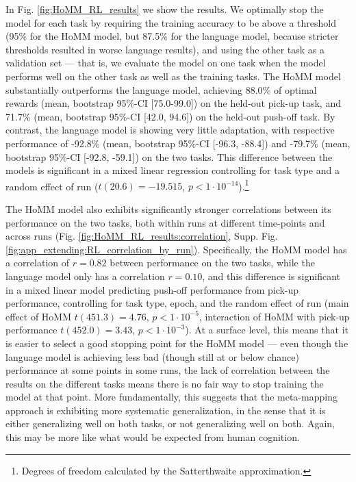 In Fig. \ref{fig:HoMM_RL_results} we show the results. We optimally stop the model for each task by requiring the training accuracy to be above a threshold (95\% for the HoMM model, but 87.5\% for the language model, because stricter thresholds resulted in worse language results), and using the other task as a validation set --- that is, we evaluate the model on one task when the model performs well on the other task as well as the training tasks. The HoMM model substantially outperforms the language model, achieving 88.0\% of optimal rewards (mean, bootstrap 95\%-CI [75.0-99.0]) on the held-out pick-up task, and 71.7\% (mean, bootstrap 95\%-CI [42.0, 94.6]) on the held-out push-off task. By contrast, the language model is showing very little adaptation, with respective performance of -92.8\% (mean, bootstrap 95\%-CI [-96.3, -88.4]) and -79.7\% (mean, bootstrap 95\%-CI [-92.8, -59.1]) on the two tasks. This difference between the models is significant in a mixed linear regression controlling for task type and a random effect of run (\(t (20.6) = -19.515\), \(p < 1\cdot10^{-14}\)).\footnote{Degrees of freedom calculated by the Satterthwaite approximation.}\par

The HoMM model also exhibits significantly stronger correlations between its performance on the two tasks, both within runs at different time-points and across runs (Fig. \ref{fig:HoMM_RL_results:correlation}, Supp. Fig. \ref{fig:app_extending:RL_correlation_by_run}). Specifically, the HoMM model has a correlation of \(r=0.82\) between performance on the two tasks, while the language model only has a correlation \(r=0.10\), and this difference is significant in a mixed linear model predicting push-off performance from pick-up performance, controlling for task type, epoch, and the random effect of run (main effect of HoMM \(t(451.3) = 4.76\), \(p < 1\cdot 10^{-5}\), interaction of HoMM with pick-up performance \(t(452.0) = 3.43\), \(p < 1 \cdot 10^{-3}\)). At a surface level, this means that it is easier to select a good stopping point for the HoMM model --- even though the language model is achieving less bad (though still at or below chance) performance at some points in some runs, the lack of correlation between the results on the different tasks means there is no fair way to stop training the model at that point. More fundamentally, this suggests that the meta-mapping approach is exhibiting more systematic generalization, in the sense that it is either generalizing well on both tasks, or not generalizing well on both. Again, this may be more like what would be expected from human cognition.

